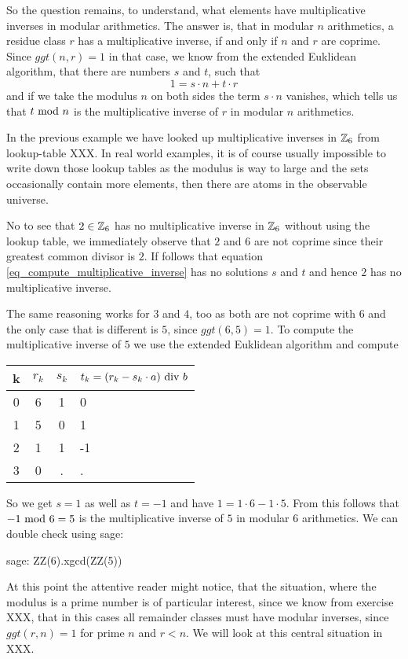 So the question remains, to understand, what elements have multiplicative inverses in modular arithmetics. The answer is, that in modular $n$ arithmetics, a residue class $r$ has a multiplicative inverse, if and only if $n$ and $r$ are coprime. Since $ggt(n,r)=1$ in that case, we know from the extended Euklidean algorithm, that there are numbers $s$ and $t$, such that 
\begin{equation}
\label{eq_compute_multiplicative_inverse}
1 = s\cdot n + t\cdot r
\end{equation}
and if we take the modulus $n$ on both sides the term $s\cdot n$ vanishes, which tells us that $t \text{ mod } n$ is the multiplicative inverse of $r$ in modular $n$ arithmetics.
\begin{example} In the previous example we have looked up multiplicative inverses in $\mathbb{Z}_6$ from lookup-table XXX. In real world examples, it is of course usually impossible to write down those lookup tables as the modulus is way to large and the sets occasionally contain more elements, then there are atoms in the observable universe.

No to see that $2\in \mathbb{Z}_6$ has no multiplicative inverse in $\mathbb{Z}_6$ without using the lookup table, we immediately observe that $2$ and $6$ are not coprime since their greatest common divisor is $2$. If follows that equation \ref{eq_compute_multiplicative_inverse} has no solutions $s$ and $t$ and hence $2$ has no multiplicative inverse.

The same reasoning works for $3$ and $4$, too as both are not coprime with $6$ and the only case that is different is $5$, since $ggt(6,5)=1$. To compute the multiplicative inverse of $5$ we use the extended Euklidean algorithm and compute   
\begin{center}
  \begin{tabular}{c | c c l}
    k & $ r_k $ & $ s_k $ & $ t_k = (r_k-s_k \cdot a) \text{ div } b $ \\\hline
    0 & 6 & 1 & 0 \\
    1 & 5 & 0 & 1 \\
    2 & 1 & 1 & -1 \\
    3 & 0 & . & . \\
  \end{tabular}
\end{center}
So we get $s=1$ as well as $t=-1$ and have $1 = 1\cdot 6 -1\cdot 5$. From this follows that $-1 \text{ mod } 6=5$ is the multiplicative inverse of $5$ in modular $6$ arithmetics. We can double check using sage:
\begin{sagecommandline}
sage: ZZ(6).xgcd(ZZ(5))
\end{sagecommandline}
\end{example}
At this point the attentive reader might notice, that the situation, where the modulus is a prime number is of particular interest, since we know from exercise XXX, that in this cases all remainder classes must have modular inverses, since $ggt(r,n)=1$ for prime $n$ and $r<n$. We will look at this central situation in XXX. 

